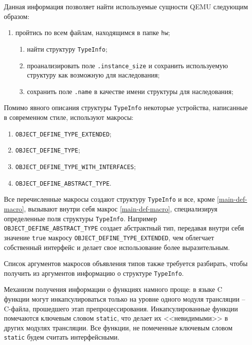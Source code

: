 Данная информация позволяет найти используемые сущности QEMU следующим образом:
\begin{enumerate}[label={\arabic*)}]
    \item пройтись по всем файлам, находящимся в папке \texttt{hw};
    \begin{enumerate}[label={\arabic*)}]
        \item найти структуру \texttt{TypeInfo};
        \item проанализировать поле \texttt{.instance\_size} и сохранить
              используемую структуру как возможную для наследования;
        \item сохранить поле \texttt{.name} в качестве имени структуры для наследования;
    \end{enumerate}
\end{enumerate}

Помимо явного описания структуры \texttt{TypeInfo} некоторые устройства, написанные
в современном стиле, используют макросы:
\begin{enumerate}[label={\arabic*)}]
    \item \label{main-def-macro} \texttt{OBJECT\_DEFINE\_TYPE\_EXTENDED};
    \item \texttt{OBJECT\_DEFINE\_TYPE};
    \item \texttt{OBJECT\_DEFINE\_TYPE\_WITH\_INTERFACES};
    \item \texttt{OBJECT\_DEFINE\_ABSTRACT\_TYPE}.
\end{enumerate}

Все перечисленные макросы создают структуру \texttt{TypeInfo} и все, кроме \ref{main-def-macro},
вызывают внутри себя макрос \ref{main-def-macro}, специализируя определенные поля структуры \texttt{TypeInfo}.
Например \texttt{OBJECT\_DEFINE\_ABSTRACT\_TYPE} создает абстрактный тип, передавая внутри себя
значение \texttt{true} макросу \texttt{OBJECT\_DEFINE\_TYPE\_EXTENDED}, чем облегчает собственный интерфейс
и делает свое использование более выразительным.

Список аргументов макросов объявления типов также требуется разбирать, чтобы получить из аргументов информацию
о структуре \texttt{TypeInfo}.

Механизм получения информации о функциях намного проще: в языке C функции могут инкапсулироваться
только на уровне одного модуля трансляции -- C-файла, прошедшего этап препроцессирования.
Инкапсулированные функции помечаются ключевым словом \texttt{static}, что делает их
<<невидимыми>> в других модулях трансляции.
Все функции, не помеченные ключевым словом \texttt{static} будем считать интерфейсными.

